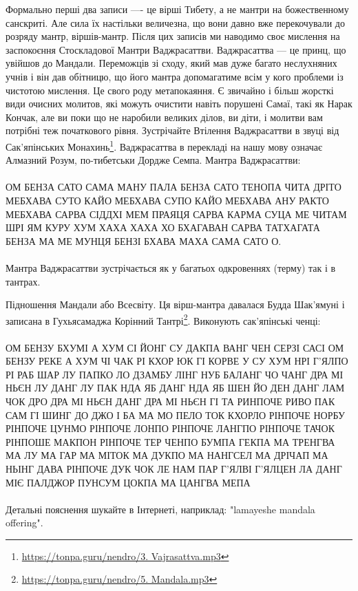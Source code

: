 Формально перші два записи ---- це вірші Тибету, а не мантри
на божественному санскриті. Але сила їх настільки величезна, що
вони давно вже перекочували до розряду мантр, віршів-мантр. Після
цих записів ми наводимо своє мислення на заспокоєння Стоскладової
Мантри Ваджрасаттви. Ваджрасаттва --- це принц, що увійшов до Мандали.
Переможців зі сходу, який мав дуже багато неслухняних
учнів і він дав обітницю, що його мантра допомагатиме всім у кого
проблеми із чистотою мислення. Це свого роду метапокаяння.
Є звичайно і більш жорсткі види очисних молитов, які можуть
очистити навіть порушені Самаї, такі як Нарак Кончак, але ви поки що
не наробили великих ділов, ви діти, і молитви вам потрібні теж початкового
рівня. Зустрічайте Втілення Ваджрасаттви в звуці від
Сак'япінських Монахинь\footnote{\url{https://tonpa.guru/nendro/3. Vajrasattva.mp3}}.
Ваджрасаттва в перекладі на нашу мову означає Алмазний Розум, по-тибетськи
Дордже Семпа. Мантра Ваджрасаттви:
\\
\\
ОМ БЕНЗА САТО САМА МАНУ ПАЛА БЕНЗА САТО ТЕНОПА ЧИТА ДРІТО
МЕБХАВА СУТО КАЙО МЕБХАВА СУПО КАЙО МЕБХАВА АНУ РАКТО МЕБХАВА
САРВА СІДДХІ МЕМ ПРАЯЦЯ САРВА КАРМА СУЦА МЕ ЧИТАМ ШРІ ЯМ КУРУ
ХУМ ХАХА ХАХА ХО БХАГАВАН САРВА ТАТХАГАТА БЕНЗА МА МЕ МУНЦЯ
БЕНЗІ БХАВА МАХА САМА САТО О.
\\
\\
Мантра Ваджрасаттви зустрічається як у багатьох одкровеннях (терму) так і в тантрах.

Підношення Мандали або Всесвіту. Ця вірш-мантра давалася
Будда Шак'ямуні і записана в Гухьясамаджа Корінний
Тантрі\footnote{\url{https://tonpa.guru/nendro/5. Mandala.mp3}}.
Виконують сак'япінські ченці:
\\
\\
ОМ БЕНЗУ БХУМІ А ХУМ СІ ЙОНГ СУ ДАКПА ВАНГ ЧЕН СЕРЗІ
САСІ ОМ БЕНЗУ РЕКЕ А ХУМ ЧІ ЧАК РІ КХОР ЮК ГІ КОРВЕ
У СУ ХУМ НРІ Г'ЯЛПО РІ РАБ ШАР ЛУ ПАПКО ЛО ДЗАМБУ
ЛІНГ НУБ БАЛАНГ ЧО ЧАНГ ДРА МІ НЬЄН ЛУ ДАНГ ЛУ ПАК
НДА ЯБ ДАНГ НДА ЯБ ШЕН ЙО ДЕН ДАНГ ЛАМ ЧОК ДРО ДРА
МІ НЬЄН ДАНГ ДРА МІ НЬЄН ГІ ТА РИНПОЧЕ РИВО ПАК САМ
ГІ ШИНГ ДО ДЖО І БА МА МО ПЕЛО ТОК КХОРЛО РІНПОЧЕ
НОРБУ РІНПОЧЕ ЦУНМО РІНПОЧЕ ЛОНПО РІНПОЧЕ ЛАНГПО
РІНПОЧЕ ТАЧОК РІНПОШЕ МАКПОН РІНПОЧЕ ТЕР ЧЕНПО
БУМПА ГЕКПА МА ТРЕНГВА МА ЛУ МА ГАР МА МІТОК МА
ДУКПО МА НАНГСЕЛ МА ДРІЧАП МА НЬІНГ ДАВА РІНПОЧЕ
ДУК ЧОК ЛЕ НАМ ПАР Г'ЯЛВІ Г'ЯЛЦЕН ЛА ДАНГ МІЄ ПАЛДЖОР
ПУНСУМ ЦОКПА МА ЦАНГВА МЕПА
\\
\\
Детальні пояснення шукайте в Інтернеті, наприклад: "lamayeshe mandala offering".

